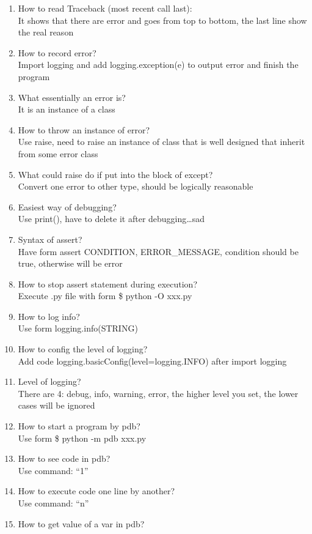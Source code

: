 \documentclass[10pt,a4paper,oneside]{article}
\begin{document}
\begin{enumerate}[1.]
\item How to read Traceback (most recent call last):\\
It shows that there are error and goes from top to bottom, the last line show the real reason
\item How to record error?\\
Import logging and add logging.exception(e) to output error and finish the program
\item What essentially an error is?\\
It is an instance of a class
\item How to throw an instance of error?\\
Use raise, need to raise an instance of class that is well designed that inherit from some error class
\item What could raise do if put into the block of except?\\
Convert one error to other type, should be logically reasonable
\item Easiest way of debugging?\\
Use print(), have to delete it after debugging\dots sad
\item Syntax of assert?\\
Have form assert CONDITION, ERROR\_MESSAGE,  condition should be true, otherwise will be error
\item How to stop assert statement during execution?\\
Execute .py file with form \$ python -O xxx.py
\item How to log info?\\
Use form logging.info(STRING)
\item How to config the level of logging?\\
Add code logging.basicConfig(level=logging.INFO) after import logging
\item Level of logging?\\
There are 4: debug, info, warning, error, the higher level you set, the lower cases will be ignored
\item How to start a program by pdb?\\
Use form \$ python -m pdb xxx.py
\item How to see code in pdb?\\
Use command: ``1''
\item How to execute code one line by another?\\
Use command: ``n''
\item How to get value of a var in pdb?\\

\end{enumerate}
\end{document}
